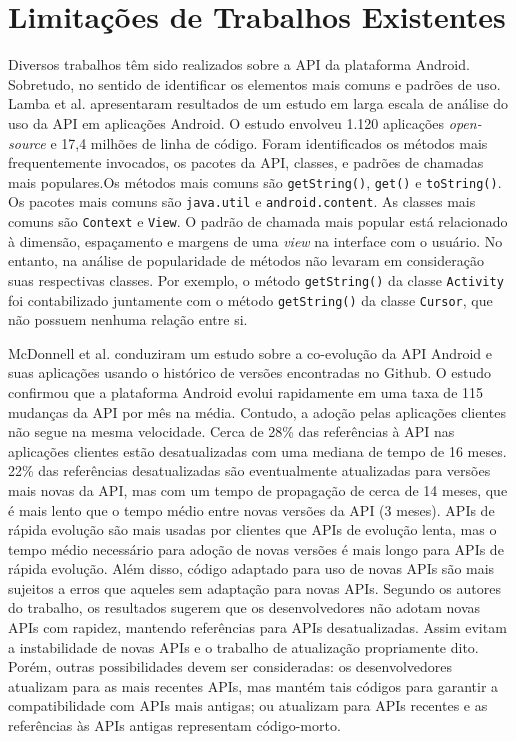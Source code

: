 \section{Limitações de Trabalhos Existentes} \label{sec:limitacao-abordagens-atuais}
Diversos trabalhos têm sido realizados sobre a API da plataforma Android. Sobretudo,
no sentido
de identificar os elementos mais comuns e padrões de uso. Lamba et al.\cite{Lamba2015} apresentaram
resultados de um estudo em larga escala de análise do uso da API em aplicações Android.
O estudo envolveu 1.120 aplicações \textit{open-source} e 17,4 milhões de linha de código.
Foram identificados os métodos mais frequentemente invocados, os pacotes da API,
classes, e padrões de chamadas mais populares.Os métodos mais comuns são \texttt{getString()},
\texttt{get()} e \texttt{toString()}. Os pacotes mais comuns são \texttt{java.util} e
\texttt{android.content}. As classes mais comuns são \texttt{Context} e \texttt{View}.
O padrão de chamada mais popular está relacionado à dimensão, espaçamento e margens
de uma \textit{view} na interface com o usuário. No entanto, na análise de popularidade
de métodos não levaram em consideração suas respectivas classes. Por exemplo, o método
\texttt{getString()} da classe \texttt{Activity} foi contabilizado juntamente com
o método \texttt{getString()} da classe \texttt{Cursor}, que não possuem nenhuma
relação entre si.

McDonnell et al. \cite{McDonnell2013} conduziram um estudo sobre a co-evolução
da API Android e suas aplicações usando o histórico de versões encontradas no
Github. O estudo confirmou que a plataforma Android evolui rapidamente em uma
taxa de 115 mudanças da API por mês na média. Contudo, a adoção pelas aplicações
clientes não segue na mesma velocidade. Cerca de 28\% das referências à API nas
aplicações clientes estão desatualizadas com uma mediana de tempo de 16 meses.
22\% das referências desatualizadas são eventualmente atualizadas para versões
mais novas da API, mas com um tempo de propagação de cerca de 14 meses, que é mais
lento que o tempo médio entre novas versões da API (3 meses). APIs de rápida
evolução são mais usadas por clientes que APIs de evolução lenta, mas o tempo
médio necessário para adoção de novas versões é mais longo para APIs de rápida
evolução. Além disso, código adaptado para uso de novas APIs são mais sujeitos a
erros que aqueles sem adaptação para novas APIs. Segundo os autores do trabalho,
os resultados sugerem que os desenvolvedores não adotam novas APIs com rapidez,
mantendo referências para APIs desatualizadas. Assim evitam a instabilidade de
novas APIs e o trabalho de atualização propriamente dito. Porém, outras possibilidades
devem ser consideradas: os desenvolvedores atualizam para as mais recentes APIs,
mas mantém tais códigos para garantir a compatibilidade com APIs mais antigas;
ou atualizam para APIs recentes e as referências às APIs antigas representam
código-morto.

